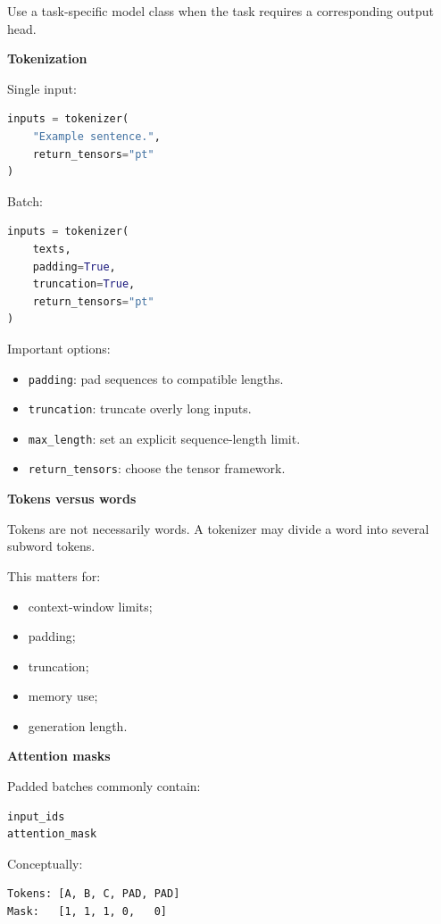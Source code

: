 \documentclass[11pt,letterpaper]{article}
\begin{document}
Use a task-specific model class when the task requires a corresponding output
head.

\textbf{Tokenization}

Single input:

\begin{lstlisting}[language=Python]
inputs = tokenizer(
    "Example sentence.",
    return_tensors="pt"
)
\end{lstlisting}

Batch:

\begin{lstlisting}[language=Python]
inputs = tokenizer(
    texts,
    padding=True,
    truncation=True,
    return_tensors="pt"
)
\end{lstlisting}

Important options:

\begin{itemize}[leftmargin=*]
    \item \texttt{padding}: pad sequences to compatible lengths.
    \item \texttt{truncation}: truncate overly long inputs.
    \item \texttt{max\_length}: set an explicit sequence-length limit.
    \item \texttt{return\_tensors}: choose the tensor framework.
\end{itemize}

\textbf{Tokens versus words}

Tokens are not necessarily words. A tokenizer may divide a word into several
subword tokens.

This matters for:

\begin{itemize}[leftmargin=*]
    \item context-window limits;
    \item padding;
    \item truncation;
    \item memory use;
    \item generation length.
\end{itemize}

\textbf{Attention masks}

Padded batches commonly contain:

\begin{lstlisting}
input_ids
attention_mask
\end{lstlisting}

Conceptually:

\begin{lstlisting}
Tokens: [A, B, C, PAD, PAD]
Mask:   [1, 1, 1, 0,   0]
\end{lstlisting}
\end{document}
